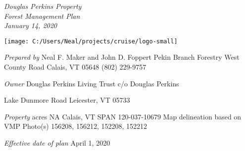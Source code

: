 \documentclass[]{tufte-handout}
\date{}
\begin{document}
\thispagestyle{empty}

\LARGE \emph{Douglas Perkins Property}\\
\Large \emph{Forest Management Plan}\\
\Large \emph{January 14, 2020}

\begin{marginfigure}

{\centering \texttt{[image: C:/Users/Neal/projects/cruise/logo-small]} 

}

\end{marginfigure}

\normalsize 

\begin{marginfigure}
\noindent \textit{\large Prepared by} 
\newline\indent Neal F. Maker and John D. Foppert  
\newline\indent Pekin Branch Forestry  
\newline{} West County Road  
\newline\indent Calais, VT 05648  
\newline\indent (802) 229-9757  
\end{marginfigure}

\begin{marginfigure}
\noindent \textit{\large Owner}
\newline\indent Douglas Perkins Living Trust  
\newline\indent c/o Douglas Perkins

 Lake Dunmore Road
\newline\indent Leicester, VT 05733  
\end{marginfigure}

\begin{marginfigure}
\noindent \textit{\large Property}   
\newline{} acres NA   
\newline\indent Calais, VT  
\newline\indent SPAN 120-037-10679  
\newline\indent Map delineation based on VMP  
\newline\indent Photo(s) 156208, 156212, 152208, 152212  
\end{marginfigure}

\begin{marginfigure}
\noindent \textit{\large Effective date of plan}  
\newline\indent April 1, 2020  
\end{marginfigure}
\end{document}
